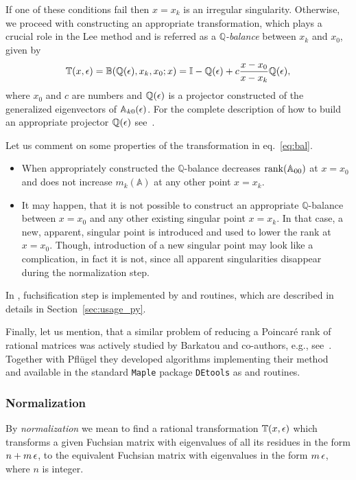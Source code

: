 \documentclass[12pt,a4paper]{article}
\def\M#1{\mathbb{#1}} %
\begin{document}
If one of these conditions fail then $x=x_k$ is an irregular singularity.
Otherwise, we proceed with constructing an appropriate transformation, which plays a crucial role in the Lee method and is referred as a {\em $\M Q$-balance} between $x_k$ and $x_0$, given by
\begin{equation}
  \label{eq:bal}
  \M T(x,\eps) = \M B(\M Q(\eps), x_k, x_0; x) = \M I - \M Q(\eps) + c \frac{x-x_0}{x-x_k} \M Q(\eps),
\end{equation}
where $x_0$ and $c$ are numbers and $\M Q(\eps)$ is a projector constructed of the generalized eigenvectors of $\M A_{k0}(\eps)$.
For the complete description of how to build an appropriate projector $\M Q(\eps)$ see~\cite[p.~9]{Lee15}.

Let us comment on some properties of the transformation in eq.~\eqref{eq:bal}.
\begin{itemize}
  \item When appropriately constructed the $\M Q$-balance decreases $\rank(\M A_{00})$ at $x=x_0$ and does not increase $m_k(\M A)$ at any other point $x=x_k$.
  \item It may happen, that it is not possible to construct an appropriate $\M Q$-balance between $x=x_0$ and any other existing singular point $x=x_k$.
        In that case, a new, apparent, singular point is introduced and used to lower the rank at $x=x_0$.
        Though, introduction of a new singular point may look like a complication, in fact it is not, since all apparent singularities disappear during the normalization step.
\end{itemize}

In \fuchsia, fuchsification step is implemented by  and  routines, which are described in details in Section~\ref{sec:usage_py}.

Finally, let us mention, that a similar problem of reducing a Poincar\'e rank of rational matrices was actively studied by Barkatou and co-authors, e.g., see~\cite{BP99}.
Together with Pfl\"ugel they developed algorithms implementing their method~\cite{BP99} and available in the standard \texttt{Maple} package \texttt{DEtools} as  and  routines.


\subsubsection{Normalization}
\label{sec:norm}

By {\em normalization} we mean to find a rational transformation $\M T(x,\eps)$ which transforms a given Fuchsian matrix with eigenvalues of all its residues in the form $n + m \, \epsilon$, to the equivalent Fuchsian matrix with eigenvalues in the form $m \, \epsilon$, where $n$ is integer.
\end{document}
